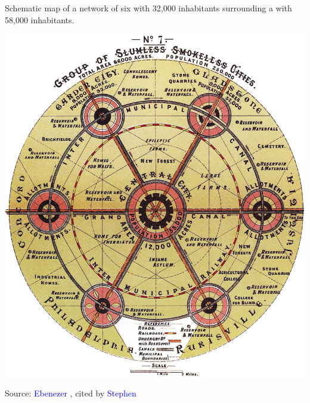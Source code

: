 \begin{refsegment}
\begin{carte}[h!]\vspace*{4pt}
    \caption{Schematic map of a network of six  with 32,000 inhabitants surrounding a  with 58,000 inhabitants.}
    \label{fig-chap1:schema-cite-jardin}
    \centerline{\includegraphics[width=0.75\columnwidth]{src/Figures/Chap-1/Cite_jardin.jpg}}
    \vspace{5pt}
    \begin{flushright}\scriptsize{
    Source: \textcolor{blue}{Ebenezer} \textcolor{blue}{\textcite[90]{howard_-morrow_1898}}, cited by \textcolor{blue}{Stephen} \textcolor{blue}{\textcite[3]{ward_garden_1992}}
    }\end{flushright}
\end{carte}


\end{refsegment}
